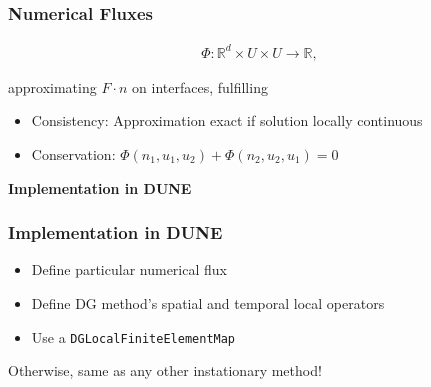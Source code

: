 \documentclass[ignorenonframetext,11pt]{beamer}
\theoremstyle{definition}
\begin{document}
\begin{frame}
\frametitle{Numerical Fluxes}


\begin{align*}
\Phi :  \mathbb{R}^d \times U \times U \rightarrow \mathbb{R},
\end{align*}

approximating $F \cdot n$ on interfaces, fulfilling

\begin{itemize}
  \item Consistency: Approximation exact if solution locally continuous
  \item Conservation: $\Phi(n_1,u_1,u_2) + \Phi(n_2, u_2, u_1) = 0$

\end{itemize}
\end{frame}


\begin{frame}
\begin{center}
\Large\textbf{Implementation in DUNE}
\end{center}
\end{frame}

\begin{frame}
\frametitle{Implementation in DUNE}

\begin{itemize}
  \item Define particular numerical flux
  \item Define DG method's spatial and temporal local operators
  \item Use a \texttt{DGLocalFiniteElementMap}
\end{itemize}
Otherwise, same as any other instationary method!
\end{frame}
\end{document}
